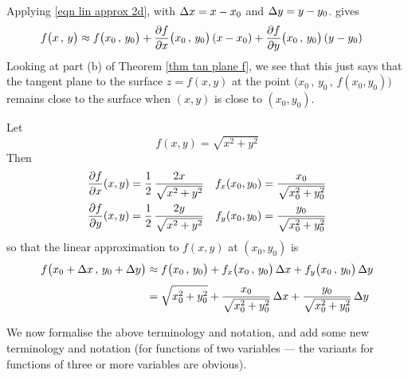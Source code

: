 \begin{remark}\label{rmk lin approx tan plane}
Applying \eqref{eqn lin approx 2d}, with $\Delta x=x-x_0$ and $\Delta y = y-y_0$.
gives
\begin{align*}
f\big(x\,,\,y\big)
&\approx f\big(x_0\,,\,y_0\big) 
       + \pdiff{f}{x}\big(x_0\,,\,y_0\big)\,(x-x_0)
       + \pdiff{f}{y}\big(x_0\,,\,y_0\big)\,(y-y_0)
\end{align*}
Looking at part (b) of Theorem \ref{thm tan plane f},
we see that this just says that the tangent plane to the surface 
$z=f(x,y)$ at the point $\big(x_0\,,\,y_0\,,\,f(x_0,y_0)\big)$
remains close to the surface when $(x,y)$ is close to $(x_0,y_0)$.
\end{remark}


\begin{eg}\label{eg approx AA}
Let 
\begin{equation*}
f(x,y) = \sqrt{x^2+y^2}
\end{equation*}
Then
\begin{align*}
\pdiff{f}{x}(x,y)&=\frac{1}{2}\,\frac{2x}{\sqrt{x^2+y^2}} &
    f_x(x_0,y_0)&=\frac{x_0}{\sqrt{x_0^2+y_0^2}} \\
\pdiff{f}{y}(x,y)&=\frac{1}{2}\,\frac{2y}{\sqrt{x^2+y^2}} &
    f_y(x_0,y_0)&=\frac{y_0}{\sqrt{x_0^2+y_0^2}} 
\end{align*}
so that the linear approximation to $f(x,y)$ at $(x_0,y_0)$ is
\begin{align*}
f\big(x_0+\Delta x\,,\,y_0+\Delta y\big)
&\approx f\big(x_0\,,\,y_0\big) 
       + f_x\big(x_0\,,\,y_0\big)\,\Delta x
       + f_y\big(x_0\,,\,y_0\big)\,\Delta y \\[0.05in]
&=\sqrt{x_0^2+y_0^2} 
       + \frac{x_0}{\sqrt{x_0^2+y_0^2}}\,\Delta x
       + \frac{y_0}{\sqrt{x_0^2+y_0^2}}\,\Delta y 
\end{align*}

\end{eg}

We now formalise the above terminology and notation, and add some new terminology and notation
(for functions of two variables --- the variants for functions of three or more variables are obvious).

